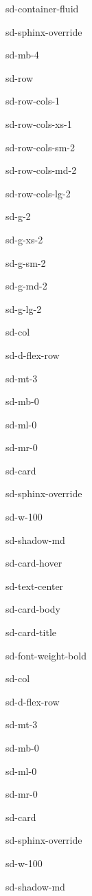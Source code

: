 \documentclass[letterpaper,10pt,english]{jupyterBook}
\begin{document}
\begin{sphinxuseclass}{sd-container-fluid}
\begin{sphinxuseclass}{sd-sphinx-override}
\begin{sphinxuseclass}{sd-mb-4}
\begin{sphinxuseclass}{sd-row}
\begin{sphinxuseclass}{sd-row-cols-1}
\begin{sphinxuseclass}{sd-row-cols-xs-1}
\begin{sphinxuseclass}{sd-row-cols-sm-2}
\begin{sphinxuseclass}{sd-row-cols-md-2}
\begin{sphinxuseclass}{sd-row-cols-lg-2}
\begin{sphinxuseclass}{sd-g-2}
\begin{sphinxuseclass}{sd-g-xs-2}
\begin{sphinxuseclass}{sd-g-sm-2}
\begin{sphinxuseclass}{sd-g-md-2}
\begin{sphinxuseclass}{sd-g-lg-2}
\begin{sphinxuseclass}{sd-col}
\begin{sphinxuseclass}{sd-d-flex-row}
\begin{sphinxuseclass}{sd-mt-3}
\begin{sphinxuseclass}{sd-mb-0}
\begin{sphinxuseclass}{sd-ml-0}
\begin{sphinxuseclass}{sd-mr-0}
\begin{sphinxuseclass}{sd-card}
\begin{sphinxuseclass}{sd-sphinx-override}
\begin{sphinxuseclass}{sd-w-100}
\begin{sphinxuseclass}{sd-shadow-md}
\begin{sphinxuseclass}{sd-card-hover}
\begin{sphinxuseclass}{sd-text-center}
\begin{sphinxuseclass}{sd-card-body}
\begin{sphinxuseclass}{sd-card-title}
\begin{sphinxuseclass}{sd-font-weight-bold}
\end{sphinxuseclass}
\end{sphinxuseclass}




\end{sphinxuseclass}
\end{sphinxuseclass}
\end{sphinxuseclass}
\end{sphinxuseclass}
\end{sphinxuseclass}
\end{sphinxuseclass}
\end{sphinxuseclass}
\end{sphinxuseclass}
\end{sphinxuseclass}
\end{sphinxuseclass}
\end{sphinxuseclass}
\end{sphinxuseclass}
\end{sphinxuseclass}
\begin{sphinxuseclass}{sd-col}
\begin{sphinxuseclass}{sd-d-flex-row}
\begin{sphinxuseclass}{sd-mt-3}
\begin{sphinxuseclass}{sd-mb-0}
\begin{sphinxuseclass}{sd-ml-0}
\begin{sphinxuseclass}{sd-mr-0}
\begin{sphinxuseclass}{sd-card}
\begin{sphinxuseclass}{sd-sphinx-override}
\begin{sphinxuseclass}{sd-w-100}
\begin{sphinxuseclass}{sd-shadow-md}

\end{sphinxuseclass}
\end{sphinxuseclass}
\end{sphinxuseclass}
\end{sphinxuseclass}
\end{sphinxuseclass}
\end{sphinxuseclass}
\end{sphinxuseclass}
\end{sphinxuseclass}
\end{sphinxuseclass}
\end{sphinxuseclass}
\end{sphinxuseclass}
\end{sphinxuseclass}
\end{sphinxuseclass}
\end{sphinxuseclass}
\end{sphinxuseclass}
\end{sphinxuseclass}
\end{sphinxuseclass}
\end{sphinxuseclass}
\end{sphinxuseclass}
\end{sphinxuseclass}
\end{sphinxuseclass}
\end{sphinxuseclass}
\end{sphinxuseclass}
\end{sphinxuseclass}
\end{document}
